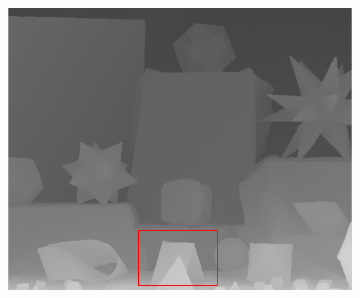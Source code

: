\documentclass[preprint,10pt,5p,times,twocolumn]{elsarticle}
\begin{document}
\begin{figure}[t]
\begin{center}
\begin{subfigure}[b]{0.136\linewidth}
    \includegraphics[width=\linewidth]{cmp_moebius_8X_MST.png}
    \label{fig:} %
\end{subfigure}


\end{center}
\end{figure}
\end{document}
